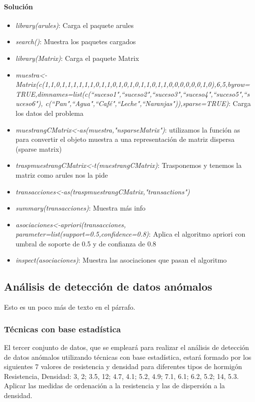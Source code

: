 \documentclass[a4paper, 12pt]{article}
\begin{document}
        \paragraph{Solución}
        \begin{itemize}
            \item \emph{library(arules)}: Carga el paquete arules
            \item \emph{search()}: Muestra los paquetes cargados
            \item \emph{library(Matrix)}: Carga el paquete Matrix
            \item \emph{muestra<-Matrix(c(1,1,0,1,1,1,1,1,1,0,1,1,0,1,0,1,0,1,1,0,1,1,0,0,0,0,0,0,1,0),6,5,byrow=TRUE,dimnames=list(c(\textquotedblleft suceso1",\textquotedblleft suceso2",\textquotedblleft suceso3",\textquotedblleft suceso4",\textquotedblleft suceso5",\textquotedblleft suceso6"), c(\textquotedblleft Pan",\textquotedblleft Agua",\textquotedblleft Café",\textquotedblleft Leche",\textquotedblleft Naranjas")),sparse=TRUE)}: Carga los datos del problema
            \item \emph{muestrangCMatrix<-as(muestra,"nsparseMatrix")}: utilizamos la función as para convertir el objeto muestra a una representación de matriz dispersa (sparse matrix)
            \item \emph{traspmuestrangCMatrix<-t(muestrangCMatrix)}: Trasponemos y tenemos la matriz como arules nos la pide
            \item \emph{transacciones<-as(traspmuestrangCMatrix,"transactions")}
            \item \emph{summary(transacciones)}: Muestra más info
            \item \emph{asociaciones<-apriori(transacciones, parameter=list(support=0.5,confidence=0.8)}: Aplica el algoritmo apriori con umbral de soporte de 0.5 y de confianza de 0.8
            \item \emph{inspect(asociaciones)}: Muestra las asociaciones que pasan el algoritmo
        \end{itemize}
    \subsection{Análisis de detección de datos anómalos}
        Esto es un poco más de texto en el párrafo.
    
    \subsubsection{Técnicas con base estadística}
    El tercer conjunto de datos, que se empleará para realizar el análisis de detección de datos anómalos utilizando técnicas con base estadística, estará formado por los siguientes 7 valores de resistencia y densidad para diferentes tipos de hormigón {Resistencia, Densidad}: {3, 2; 3.5, 12; 4.7, 4.1; 5.2, 4.9; 7.1, 6.1; 6.2, 5.2; 14, 5.3}. Aplicar las medidas de ordenación a la resistencia y las de dispersión a la densidad.
\end{document}

